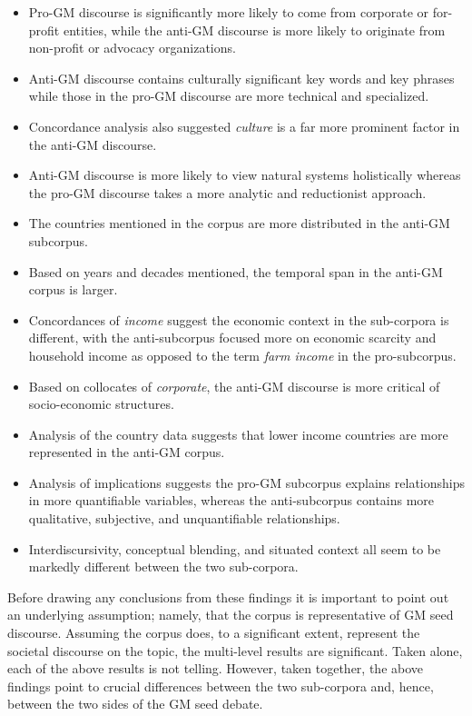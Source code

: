 \begin{itemize}
  \item Pro-GM discourse is significantly more likely to come from corporate or for-profit entities, while the anti-GM discourse is more likely to originate from non-profit or advocacy organizations. 
  \item Anti-GM discourse contains culturally significant key words and key phrases while those in the pro-GM discourse are more technical and specialized. 
  \item Concordance analysis also suggested \textit{culture} is a far more prominent factor in the anti-GM discourse.
  \item Anti-GM discourse is more likely to view natural systems holistically whereas the pro-GM discourse takes a more analytic and reductionist approach.
  \item The countries mentioned in the corpus are more distributed in the anti-GM subcorpus.
  \item Based on years and decades mentioned, the temporal span in the anti-GM corpus is larger.
  \item Concordances of \textit{income} suggest the economic context in the sub-corpora is different, with the anti-subcorpus focused more on economic scarcity and household income as opposed to the term \textit{farm income} in the pro-subcorpus.
  \item Based on collocates of \textit{corporate}, the anti-GM discourse is more critical of socio-economic structures.
  \item Analysis of the country data suggests that lower income countries are more represented in the anti-GM corpus.
  \item Analysis of implications suggests the pro-GM subcorpus explains relationships in more quantifiable variables, whereas the anti-subcorpus contains more qualitative, subjective, and unquantifiable relationships.
  \item Interdiscursivity, conceptual blending, and situated context all seem to be markedly different between the two sub-corpora.
\end{itemize}

Before drawing any conclusions from these findings it is important to point out an underlying assumption; namely, that the corpus is representative of GM seed discourse. Assuming the corpus does, to a significant extent, represent the societal discourse on the topic, the multi-level results are significant. Taken alone, each of the above results is not telling. However, taken together, the above findings point to crucial differences between the two sub-corpora and, hence, between the two sides of the GM seed debate.

